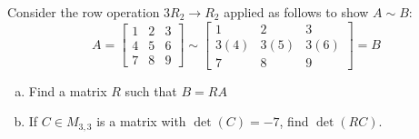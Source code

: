 \begin{applicationActivities}
\begin{activity}{5}
Consider the row operation \(3R_2\to R_2\) applied as follows to show
\(A\sim B\):
\[
A=\begin{bmatrix}1&2&3\\4&5&6\\7&8&9\end{bmatrix}
  \sim
\begin{bmatrix}1&2&3\\3(4)&3(5)&3(6)\\7&8&9\end{bmatrix}=B
\]
\begin{enumerate}[(a)]
\item Find a matrix \(R\) such that \(B=RA\)
\item If \(C \in M_{3,3}\) is a matrix with \(\det(C)= -7\), find \(\det(RC)\).
\end{enumerate}
\end{activity}


\end{applicationActivities}
